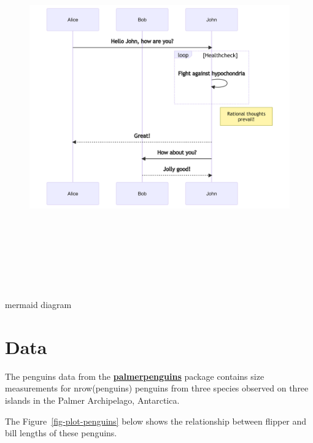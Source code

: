 \documentclass[
  12pt,
  a4paperpaper,
]{book}
\begin{document}
\begin{figure}[H]

{\centering \includegraphics[width=7.81in,height=6.13in]{./03_resultats_files/figure-latex/mermaid-figure-2.png}

}

\end{figure}

mermaid diagram

\hypertarget{data}{%
\section{Data}\label{data}}

The penguins data from the
\href{https://allisonhorst.github.io/palmerpenguins}{\textbf{palmerpenguins}}
package contains size measurements for nrow(penguins) penguins from
three species observed on three islands in the Palmer Archipelago,
Antarctica.

The Figure~\ref{fig-plot-penguins} below shows the relationship between
flipper and bill lengths of these penguins.
\end{document}
